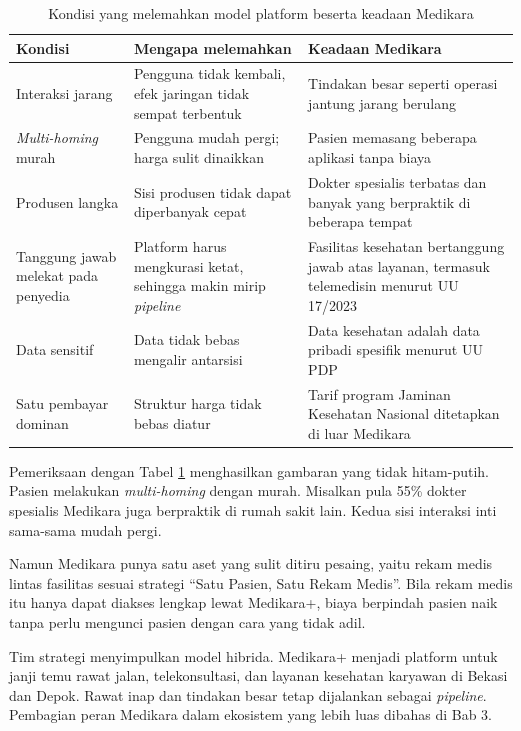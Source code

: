 \begin{table}[!htb]
  \centering
  \caption{Kondisi yang melemahkan model platform beserta keadaan Medikara}
  \label{tab:ch02-batas-platform}
  \small
  \begin{tabularx}{\textwidth}{lXX}
    \hline
    \textbf{Kondisi} & \textbf{Mengapa melemahkan} & \textbf{Keadaan Medikara} \\
    \hline
    Interaksi jarang & Pengguna tidak kembali, efek jaringan tidak sempat terbentuk & Tindakan besar seperti operasi jantung jarang berulang \\
    \hline
    \textit{Multi-homing} murah & Pengguna mudah pergi; harga sulit dinaikkan & Pasien memasang beberapa aplikasi tanpa biaya \\
    \hline
    Produsen langka & Sisi produsen tidak dapat diperbanyak cepat & Dokter spesialis terbatas dan banyak yang berpraktik di beberapa tempat \\
    \hline
    Tanggung jawab melekat pada penyedia & Platform harus mengkurasi ketat, sehingga makin mirip \textit{pipeline} & Fasilitas kesehatan bertanggung jawab atas layanan, termasuk telemedisin menurut UU 17/2023 \cite{c02-uu17-2023} \\
    \hline
    Data sensitif & Data tidak bebas mengalir antarsisi & Data kesehatan adalah data pribadi spesifik menurut UU PDP \\
    \hline
    Satu pembayar dominan & Struktur harga tidak bebas diatur & Tarif program Jaminan Kesehatan Nasional ditetapkan di luar Medikara \\
    \hline
  \end{tabularx}
\end{table}

\begin{kasus}[title={Kasus Medikara Health: Platform untuk Sebagian Layanan}]
Pemeriksaan dengan Tabel \ref{tab:ch02-batas-platform} menghasilkan gambaran
yang tidak hitam-putih. Pasien melakukan \textit{multi-homing} dengan murah.
Misalkan pula 55\% dokter spesialis Medikara juga berpraktik di rumah sakit
lain. Kedua sisi interaksi inti sama-sama mudah pergi.

Namun Medikara punya satu aset yang sulit ditiru pesaing, yaitu rekam medis
lintas fasilitas sesuai strategi ``Satu Pasien, Satu Rekam Medis''. Bila rekam
medis itu hanya dapat diakses lengkap lewat Medikara+, biaya berpindah pasien
naik tanpa perlu mengunci pasien dengan cara yang tidak adil.

Tim strategi menyimpulkan model hibrida. Medikara+ menjadi platform untuk janji
temu rawat jalan, telekonsultasi, dan layanan kesehatan karyawan di Bekasi dan
Depok. Rawat inap dan tindakan besar tetap dijalankan sebagai
\textit{pipeline}. Pembagian peran Medikara dalam ekosistem yang lebih luas
dibahas di Bab 3.
\end{kasus}

